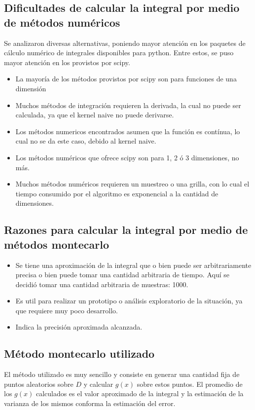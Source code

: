 \documentclass[12pt, a4paper]{article}
\begin{document}
\subsection{Dificultades de calcular la integral por medio de métodos numéricos}
Se analizaron diversas alternativas, poniendo mayor atención en los paquetes de cálculo numérico de integrales disponibles para python. Entre estos, se puso mayor atención en los provistos por scipy.
\begin{itemize}
    \item La mayoría de los métodos provistos por scipy son para funciones de una dimensión
    \item Muchos métodos de integración requieren la derivada, la cual no puede ser calculada, ya que el kernel naive no puede derivarse.
    \item Los métodos numericos encontrados asumen que la función es contínua, lo cual no se da este caso, debido al kernel naive.
    \item Los métodos numéricos que ofrece scipy son para 1, 2 ó 3 dimensiones, no más.
    \item Muchos métodos numéricos requieren un muestreo o una grilla, con lo cual el tiempo consumido por el algoritmo es exponencial a la cantidad de dimensiones.
\end{itemize}
\subsection{Razones para calcular la integral por medio de métodos montecarlo}
\begin{itemize}
    \item Se tiene una aproximación de la integral que o bien puede ser arbitrariamente precisa o bien puede tomar una cantidad arbitraria de tiempo. Aquí se decidió tomar una cantidad arbitraria de muestras: 1000.
    \item Es util para realizar un prototipo o análisis exploratorio de la situación, ya que requiere muy poco desarrollo.
    \item Indica la precisión aproximada alcanzada.
\end{itemize}
\subsection{Método montecarlo utilizado}
El método utilizado es muy sencillo y consiste en generar una cantidad fija de puntos aleatorios sobre $D$ y calcular $g(x)$ sobre estos puntos. El promedio de los $g(x)$ calculados es el valor aproximado de la integral y la estimación de la varianza de los mismos conforma la estimación del error.
\end{document}
